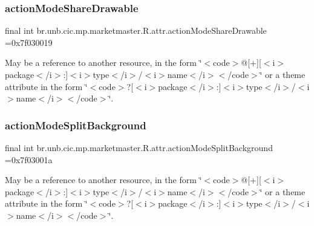 \subsubsection{\texorpdfstring{action\+Mode\+Share\+Drawable}{actionModeShareDrawable}}
{\footnotesize\ttfamily final int br.\+unb.\+cic.\+mp.\+marketmaster.\+R.\+attr.\+action\+Mode\+Share\+Drawable =0x7f030019\hspace{0.3cm}{\ttfamily [static]}}

May be a reference to another resource, in the form \char`\"{}$<$code$>$@\mbox{[}+\mbox{]}\mbox{[}$<$i$>$package$<$/i$>$\+:\mbox{]}$<$i$>$type$<$/i$>$/$<$i$>$name$<$/i$>$$<$/code$>$\char`\"{} or a theme attribute in the form \char`\"{}$<$code$>$?\mbox{[}$<$i$>$package$<$/i$>$\+:\mbox{]}$<$i$>$type$<$/i$>$/$<$i$>$name$<$/i$>$$<$/code$>$\char`\"{}. \mbox{\label{classbr_1_1unb_1_1cic_1_1mp_1_1marketmaster_1_1R_1_1attr_ab3ae1bab1484b33c1773ccaf39e150ba}} 
\subsubsection{\texorpdfstring{action\+Mode\+Split\+Background}{actionModeSplitBackground}}
{\footnotesize\ttfamily final int br.\+unb.\+cic.\+mp.\+marketmaster.\+R.\+attr.\+action\+Mode\+Split\+Background =0x7f03001a\hspace{0.3cm}{\ttfamily [static]}}

May be a reference to another resource, in the form \char`\"{}$<$code$>$@\mbox{[}+\mbox{]}\mbox{[}$<$i$>$package$<$/i$>$\+:\mbox{]}$<$i$>$type$<$/i$>$/$<$i$>$name$<$/i$>$$<$/code$>$\char`\"{} or a theme attribute in the form \char`\"{}$<$code$>$?\mbox{[}$<$i$>$package$<$/i$>$\+:\mbox{]}$<$i$>$type$<$/i$>$/$<$i$>$name$<$/i$>$$<$/code$>$\char`\"{}. \mbox{\label{classbr_1_1unb_1_1cic_1_1mp_1_1marketmaster_1_1R_1_1attr_aa8673f2f632bf9702e3d10d35d40965b}} 
